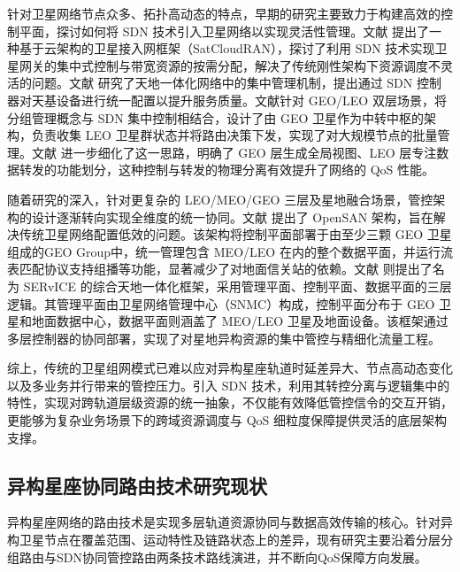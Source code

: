 \documentclass[print, master, vlined]{DissertUESTC}
\begin{document}
    针对卫星网络节点众多、拓扑高动态的特点，早期的研究主要致力于构建高效的控制平面，探讨如何将 SDN 技术引入卫星网络以实现灵活性管理。文献\cite{ahmed2018software} 提出了一种基于云架构的卫星接入网框架（SatCloudRAN），探讨了利用 SDN 技术实现卫星网关的集中式控制与带宽资源的按需分配，解决了传统刚性架构下资源调度不灵活的问题。文献\cite{JSTY201702007} 研究了天地一体化网络中的集中管理机制，提出通过 SDN 控制器对天基设备进行统一配置以提升服务质量。文献\cite{袁梦珠2017基于SDN的卫星网络关键技术研究}针对 GEO/LEO 双层场景，将分组管理概念与 SDN 集中控制相结合，设计了由 GEO 卫星作为中转中枢的架构，负责收集 LEO 卫星群状态并将路由决策下发，实现了对大规模节点的批量管理。文献\cite{石晓东2020基于} 进一步细化了这一思路，明确了 GEO 层生成全局视图、LEO 层专注数据转发的功能划分，这种控制与转发的物理分离有效提升了网络的 QoS 性能。
    
    随着研究的深入，针对更复杂的 LEO/MEO/GEO 三层及星地融合场景，管控架构的设计逐渐转向实现全维度的统一协同。文献\cite{bao2014opensan} 提出了 OpenSAN 架构，旨在解决传统卫星网络配置低效的问题。该架构将控制平面部署于由至少三颗 GEO 卫星组成的GEO Group中，统一管理包含 MEO/LEO 在内的整个数据平面，并运行流表匹配协议支持组播等功能，显著减少了对地面信关站的依赖。文献\cite{li2017service} 则提出了名为 SERvICE 的综合天地一体化框架，采用管理平面、控制平面、数据平面的三层逻辑。其管理平面由卫星网络管理中心（SNMC）构成，控制平面分布于 GEO 卫星和地面数据中心，数据平面则涵盖了 MEO/LEO 卫星及地面设备。该框架通过多层控制器的协同部署，实现了对星地异构资源的集中管控与精细化流量工程。

    综上，传统的卫星组网模式已难以应对异构星座轨道时延差异大、节点高动态变化以及多业务并行带来的管控压力。引入 SDN 技术，利用其转控分离与逻辑集中的特性，实现对跨轨道层级资源的统一抽象，不仅能有效降低管控信令的交互开销，更能够为复杂业务场景下的跨域资源调度与 QoS 细粒度保障提供灵活的底层架构支撑。
    

    \subsection{异构星座协同路由技术研究现状}
    异构星座网络的路由技术是实现多层轨道资源协同与数据高效传输的核心。针对异构卫星节点在覆盖范围、运动特性及链路状态上的差异，现有研究主要沿着分层分组路由与SDN协同管控路由两条技术路线演进，并不断向QoS保障方向发展。
    
\end{document}
